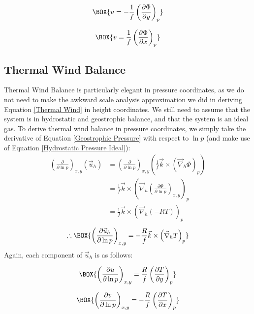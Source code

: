 \begin{minipage}{.48\linewidth}
    \begin{align*}
        \BOX{
            u = -\frac{1}{f}\left( \frac{\partial \Phi}{\partial y} \right)_p
        }
    \end{align*}
\end{minipage}
\hfill
\begin{minipage}{.48\linewidth}
    \begin{align*}
        \BOX{
            v = \frac{1}{f}\left( \frac{\partial \Phi}{\partial x} \right)_p
        }
    \end{align*}
\end{minipage}

\subsection{Thermal Wind Balance}

Thermal Wind Balance is particularly elegant in pressure coordinates, as we do not need to make the awkward scale analysis approximation we did in deriving Equation \ref{Thermal Wind} in height coordinates. We still need to assume that the system is in hydrostatic and geostrophic balance, and that the system is an ideal gas. To derive thermal wind balance in pressure coordinates, we simply take the derivative of Equation \ref{Geostrophic Pressure} with respect to \(\ln p\) (and make use of Equation \ref{Hydrostatic Pressure Ideal}):
\begin{align*}
    \left( \frac{\partial}{\partial \ln p} \right)_{x,y}\left( \vec{u}_h \right)
    &= \left( \frac{\partial}{\partial \ln p} \right)_{x,y}
    \left( \frac{1}{f}\vec{k}\times\left( \vec{\nabla}_h \Phi \right)_p \right)
    \\
    &= \frac{1}{f}\vec{k}\times\left( \vec{\nabla}_h \left( \frac{\partial \Phi}{\partial \ln p} \right)_{x,y} \right)_{p}
    \\
    &= \frac{1}{f}\vec{k}\times\left( \vec{\nabla}_h (-RT) \right)_{p}
\end{align*}
\begin{align}
    \therefore
    \BOX{
        \left( \frac{\partial \vec{u}_h}{\partial\ln p} \right)_{x,y}
        =
        -\frac{R}{f}\vec{k}\times \left( \vec{\nabla}_h T \right)_p
    }
\end{align}
Again, each component of \(\vec{u}_h\) is as follows:

\begin{minipage}{.48\linewidth}
    \begin{align*}
        \BOX{
            \left( \frac{\partial u}{\partial \ln p} \right)_{x,y}
            =\frac{R}{f}
            \left( \frac{\partial T}{\partial y} \right)_{p}
        }
    \end{align*}
\end{minipage}
\hfill
\begin{minipage}{.48\linewidth}
    \begin{align*}
        \BOX{
            \left( \frac{\partial v}{\partial \ln p} \right)_{x,y}
            =-\frac{R}{f}
            \left( \frac{\partial T}{\partial x} \right)_{p}
        }
    \end{align*}
\end{minipage}

